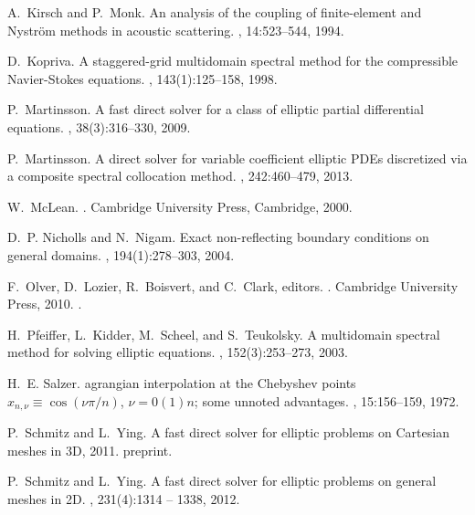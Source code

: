 \documentclass[11pt,final]{amsart}
\theoremstyle{definition}
\numberwithin{remark}{section}
\numberwithin{definition}{section}
\numberwithin{pro}{section}
\begin{document}
\begin{thebibliography}{}
A.~Kirsch and P.~Monk.
\newblock An analysis of the coupling of finite-element and {Nystr\"om} methods
  in acoustic scattering.
, 14:523--544, 1994.

D.~Kopriva.
\newblock A staggered-grid multidomain spectral method for the compressible
  {Navier-Stokes} equations.
, 143(1):125--158, 1998.

P.~Martinsson.
\newblock A fast direct solver for a class of elliptic partial differential
  equations.
, 38(3):316--330, 2009.

P.~Martinsson.
\newblock A direct solver for variable coefficient elliptic {PDE}s discretized
  via a composite spectral collocation method.
, 242:460--479, 2013.

W.~McLean.
.
\newblock Cambridge University Press, Cambridge, 2000.

D.~P. Nicholls and N.~Nigam.
\newblock Exact non-reflecting boundary conditions on general domains.
, 194(1):278--303, 2004.

F.~Olver, D.~Lozier, R.~Boisvert, and C.~Clark, editors.
.
\newblock Cambridge University Press, 2010.
.

H.~Pfeiffer, L.~Kidder, M.~Scheel, and S.~Teukolsky.
\newblock A multidomain spectral method for solving elliptic equations.
, 152(3):253--273, 2003.

H.~E. Salzer.
agrangian interpolation at the {C}hebyshev points {$x_{n,\nu}
  \equiv \cos(\nu \pi /n)$}, {$\nu=0(1)n$}; some unnoted advantages.
, 15:156--159, 1972.

P.~Schmitz and L.~Ying.
\newblock A fast direct solver for elliptic problems on {C}artesian meshes in
  {3D}, 2011.
\newblock preprint.

P.~Schmitz and L.~Ying.
\newblock A fast direct solver for elliptic problems on general meshes in {2D}.
, 231(4):1314 -- 1338, 2012.


\end{thebibliography}
\end{document}
